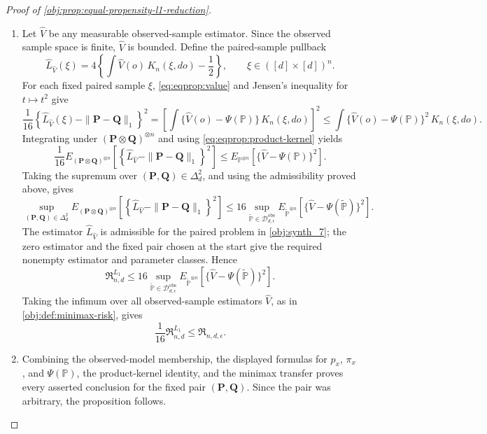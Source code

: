 \documentclass[11pt]{article}
\begin{document}
\begin{proof}[Proof of \cref{obj:prop:equal-propensity-l1-reduction}]
\begin{enumerate}
\item Let \(\widehat V\) be any measurable observed-sample estimator. Since the observed sample
space is finite, \(\widehat V\) is bounded. Define the paired-sample pullback
\[
\widehat L_{\widehat V}(\xi)
=
4\left\{\int \widehat V(o)\,K_n(\xi,do)-\frac12\right\},
\qquad
\xi\in([d]\times[d])^n .
\]
For each fixed paired sample \(\xi\), \cref{eq:eqprop:value} and Jensen's inequality for
\(t\mapsto t^2\) give
\[
\frac1{16}
\left\{
\widehat L_{\widehat V}(\xi)-\|\mathbf P-\mathbf Q\|_1
\right\}^2
=
\left[
\int\{\widehat V(o)-\Psi(\mathbb P)\}\,K_n(\xi,do)
\right]^2
\le
\int\{\widehat V(o)-\Psi(\mathbb P)\}^2\,K_n(\xi,do).
\]
Integrating under \((\mathbf P\otimes\mathbf Q)^{\otimes n}\) and using
\cref{eq:eqprop:product-kernel} yields
\[
\frac1{16}
E_{(\mathbf P\otimes\mathbf Q)^{\otimes n}}
\left[
\left\{
\widehat L_{\widehat V}-\|\mathbf P-\mathbf Q\|_1
\right\}^2
\right]
\le
E_{\mathbb P^{\otimes n}}
\left[
\{\widehat V-\Psi(\mathbb P)\}^2
\right].
\]
Taking the supremum over \((\mathbf P,\mathbf Q)\in\Delta_d^2\), and using the admissibility
proved above, gives
\[
\sup_{(\mathbf P,\mathbf Q)\in\Delta_d^2}
E_{(\mathbf P\otimes\mathbf Q)^{\otimes n}}
\left[
\left\{
\widehat L_{\widehat V}-\|\mathbf P-\mathbf Q\|_1
\right\}^2
\right]
\le
16
\sup_{\widetilde{\mathbb P}\in\mathcal D_{d,\epsilon}^{\mathrm{obs}}}
E_{\widetilde{\mathbb P}^{\otimes n}}
\left[
\{\widehat V-\Psi(\widetilde{\mathbb P})\}^2
\right].
\]
The estimator \(\widehat L_{\widehat V}\) is admissible for the paired problem in
\cref{obj:synth_7}; the zero estimator and the fixed pair chosen at the start give the required
nonempty estimator and parameter classes. Hence
\[
\mathfrak R^{L_1}_{n,d}
\le
16
\sup_{\widetilde{\mathbb P}\in\mathcal D_{d,\epsilon}^{\mathrm{obs}}}
E_{\widetilde{\mathbb P}^{\otimes n}}
\left[
\{\widehat V-\Psi(\widetilde{\mathbb P})\}^2
\right].
\]
Taking the infimum over all observed-sample estimators \(\widehat V\), as in
\cref{obj:def:minimax-risk}, gives
\[
\frac1{16}\mathfrak R^{L_1}_{n,d}
\le
\mathfrak R_{n,d,\epsilon}.
\] %

\item Combining the observed-model membership, the displayed formulas for \(p_x\), \(\pi_x\), and
\(\Psi(\mathbb P)\), the product-kernel identity, and the minimax transfer proves every asserted
conclusion for the fixed pair \((\mathbf P,\mathbf Q)\). Since the pair was arbitrary, the proposition
follows. %
\end{enumerate}
\end{proof}
\end{document}
